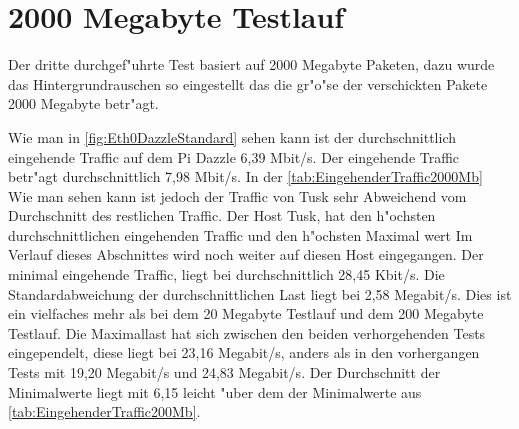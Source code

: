 \section{2000 Megabyte Testlauf}
\label{sec:2000MBTest}
Der dritte durchgef"uhrte Test basiert auf 2000 Megabyte Paketen, dazu wurde das Hintergrundrauschen %
so eingestellt das die gr"o"se der verschickten Pakete 2000 Megabyte betr"agt. 

Wie man in \cref{fig:Eth0DazzleStandard} sehen kann ist der durchschnittlich eingehende Traffic auf dem Pi Dazzle 6,39 Mbit/s. %
Der eingehende Traffic betr"agt durchschnittlich 7,98 Mbit/s. In der \cref{tab:EingehenderTraffic2000Mb} %
Wie man sehen kann ist jedoch der Traffic von Tusk sehr Abweichend vom Durchschnitt des restlichen Traffic. %
Der Host Tusk, hat den h"ochsten durchschnittlichen eingehenden Traffic und den h"ochsten Maximal wert %
Im Verlauf dieses Abschnittes wird noch weiter auf diesen Host eingegangen. Der minimal eingehende Traffic, liegt bei %
durchschnittlich 28,45 Kbit/s. Die Standardabweichung der durchschnittlichen Last liegt bei 2,58 Megabit/s. %
Dies ist ein vielfaches mehr als bei dem 20 Megabyte Testlauf und dem 200 Megabyte Testlauf. %
Die Maximallast hat sich zwischen den beiden verhorgehenden Tests eingependelt, diese liegt bei 23,16 Megabit/s, anders als in %
den vorhergangen Tests mit 19,20 Megabit/s und 24,83 Megabit/s. Der Durchschnitt der Minimalwerte liegt mit 6,15 leicht "uber dem  %
der Minimalwerte aus \cref{tab:EingehenderTraffic200Mb}.     

